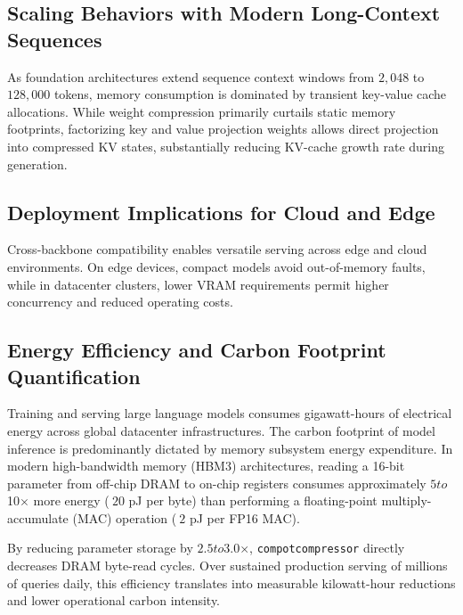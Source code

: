 \subsection{Scaling Behaviors with Modern Long-Context Sequences}
As foundation architectures extend sequence context windows from $2{,}048$ to $128{,}000$ tokens, memory consumption is dominated by transient key-value cache allocations. While weight compression primarily curtails static memory footprints, factorizing key and value projection weights allows direct projection into compressed KV states, substantially reducing KV-cache growth rate during generation.

\subsection{Deployment Implications for Cloud and Edge}
Cross-backbone compatibility enables versatile serving across edge and cloud environments. On edge devices, compact models avoid out-of-memory faults, while in datacenter clusters, lower VRAM requirements permit higher concurrency and reduced operating costs.

\subsection{Energy Efficiency and Carbon Footprint Quantification}
Training and serving large language models consumes gigawatt-hours of electrical energy across global datacenter infrastructures. The carbon footprint of model inference is predominantly dictated by memory subsystem energy expenditure. In modern high-bandwidth memory (HBM3) architectures, reading a 16-bit parameter from off-chip DRAM to on-chip registers consumes approximately $5$\times$ to $10$\times$ more energy ($~20$ pJ per byte) than performing a floating-point multiply-accumulate (MAC) operation ($~2$ pJ per FP16 MAC).

By reducing parameter storage by $2.5$\times$ to $3.0$\times$, \texttt{compotcompressor} directly decreases DRAM byte-read cycles. Over sustained production serving of millions of queries daily, this efficiency translates into measurable kilowatt-hour reductions and lower operational carbon intensity.
